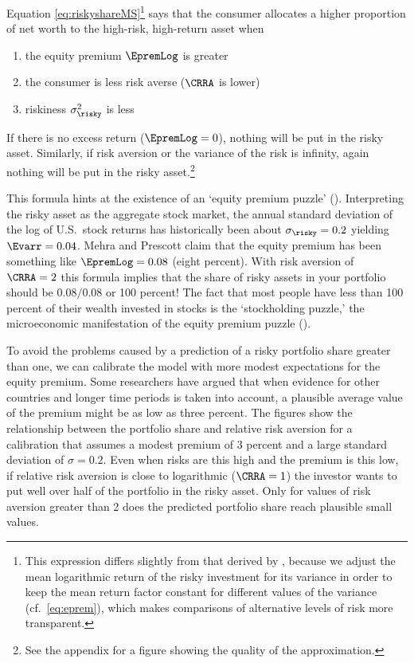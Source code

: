 Equation \eqref{eq:riskyshareMS}\footnote{This expression differs
  slightly from that derived by \cite{cvAppendix}, because we adjust
  the mean logarithmic return of the risky investment for its variance
  in order to keep the mean return factor constant for different values of the variance (cf.\ \eqref{eq:eprem}), which makes
  comparisons of alternative levels of risk more transparent.}  says that the
consumer allocates a higher proportion of net worth to the high-risk, high-return
asset when
\begin{enumerate}
\item the equity premium $\EpremLog$ is greater
\item the consumer is less risk averse ($\CRRA$ is lower)
\item riskiness $\sigma^{2}_{\risky}$ is less
\end{enumerate}
If there is no excess return ($\EpremLog = 0$), nothing will be put in the risky asset.  Similarly, if
risk aversion or the variance of the risk is infinity, again nothing
will be put in the risky asset.\footnote{See the appendix for a figure
  showing the quality of the approximation.}

This formula hints at the existence of an `equity premium puzzle'
(\cite{mehraPrescottPuzzle}).  Interpreting the risky asset as the
aggregate stock market, the annual standard deviation of the log of
U.S.\ stock returns has historically been about $\sigma_{\risky}=0.2$
yielding $\Evarr = 0.04$.  Mehra and Prescott claim that the equity premium
has been something like $\EpremLog = 0.08$ (eight percent).  With risk
aversion of $\CRRA=2$ this formula implies that the share of risky
assets in your portfolio should be $0.08/0.08$ or 100 percent!  The
fact that most people have less than 100 percent of their wealth
invested in stocks is the `stockholding puzzle,' the microeconomic
manifestation of the equity premium puzzle
(\cite{haliassos&bertaut:fewholdstocks}).

To avoid the problems caused by a prediction of a risky portfolio
share greater than one, we can calibrate the model with more modest
expectations for the equity premium.  Some researchers have argued
that when evidence for other countries and longer time periods is
taken into account, a plausible average value of the premium might be
as low as three percent.  The figures show the relationship
between the portfolio share and relative risk aversion for a
calibration that assumes a modest premium of 3 percent and a large
standard deviation of $\sigma=0.2$.  Even when risks are this high and
the premium is this low, if relative risk aversion is close to
logarithmic ($\CRRA = 1$) the investor wants to put well over half of
the portfolio in the risky asset.  Only for values of risk aversion
greater than 2 does the predicted portfolio share reach plausible
small values.

